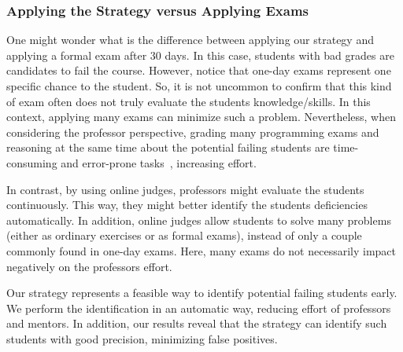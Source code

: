
\subsubsection{Applying the Strategy versus Applying Exams}

One might wonder what is the difference between applying our strategy and applying a formal exam after 30 days. In this case, students with bad grades are candidates to fail the course. However, notice that one-day exams represent one specific chance to the student. So, it is not uncommon to confirm that this kind of exam often does not truly evaluate the students knowledge/skills. In this context, applying many exams can minimize such a problem. Nevertheless, when considering the professor perspective, grading many programming exams and reasoning at the same time about the potential failing students are time-consuming and error-prone tasks~\cite{cheang-online-judge-2003}, increasing effort.

In contrast, by using online judges, professors might evaluate the students continuously. This way, they might better identify the students deficiencies automatically. In addition, online judges allow students to solve many problems (either as ordinary exercises or as formal exams), instead of only a couple commonly found in one-day exams. Here, many exams do not necessarily impact negatively on the professors effort.

Our strategy represents a feasible way to identify potential failing students early. We perform the identification in an automatic way, reducing effort of professors and mentors. In addition, our results reveal that the strategy can identify such students with good precision, minimizing false positives.






